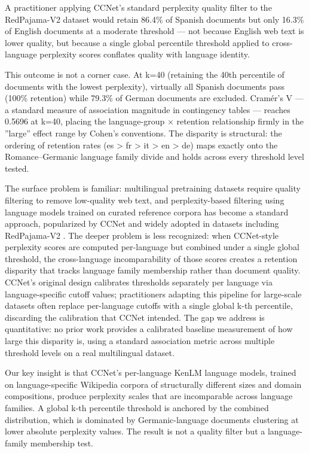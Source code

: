 
A practitioner applying CCNet's standard perplexity quality filter to the RedPajama-V2 dataset would retain 86.4\% of Spanish documents but only 16.3\% of English documents at a moderate threshold --- not because English web text is lower quality, but because a single global percentile threshold applied to cross-language perplexity scores conflates quality with language identity.

This outcome is not a corner case. At k=40 (retaining the 40th percentile of documents with the lowest perplexity), virtually all Spanish documents pass (100\% retention) while 79.3\% of German documents are excluded. Cramér's V --- a standard measure of association magnitude in contingency tables --- reaches 0.5696 at k=40, placing the language-group $\times$ retention relationship firmly in the ''large'' effect range by Cohen's conventions. The disparity is structural: the ordering of retention rates (es > fr > it > en > de) maps exactly onto the Romance--Germanic language family divide and holds across every threshold level tested.

The surface problem is familiar: multilingual pretraining datasets require quality filtering to remove low-quality web text, and perplexity-based filtering using language models trained on curated reference corpora has become a standard approach, popularized by CCNet \citep{Wenzek2019CCNet} and widely adopted in datasets including RedPajama-V2 \citep{Weber2024RedPajama}. The deeper problem is less recognized: when CCNet-style perplexity scores are computed per-language but combined under a single global threshold, the cross-language incomparability of those scores creates a retention disparity that tracks language family membership rather than document quality. CCNet's original design calibrates thresholds separately per language via language-specific cutoff values; practitioners adapting this pipeline for large-scale datasets often replace per-language cutoffs with a single global k-th percentile, discarding the calibration that CCNet intended. The gap we address is quantitative: no prior work provides a calibrated baseline measurement of how large this disparity is, using a standard association metric across multiple threshold levels on a real multilingual dataset.

Our key insight is that CCNet's per-language KenLM language models, trained on language-specific Wikipedia corpora of structurally different sizes and domain compositions, produce perplexity scales that are incomparable across language families. A global k-th percentile threshold is anchored by the combined distribution, which is dominated by Germanic-language documents clustering at lower absolute perplexity values. The result is not a quality filter but a language-family membership test.

